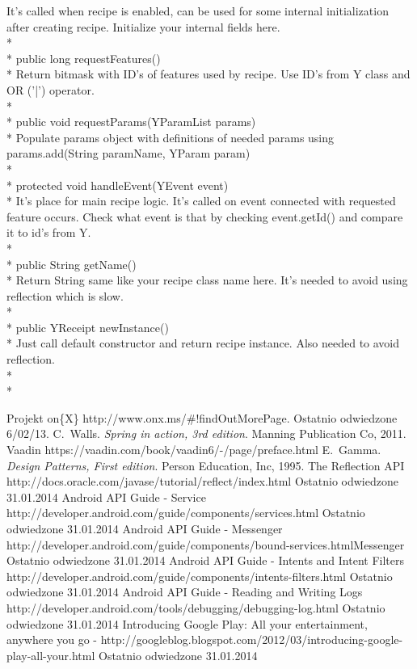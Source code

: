 \documentclass[11pt,a4paper,polish,thesis]{dcsbook}
\begin{document}
It's called when recipe is enabled, can be used for some internal initialization after creating recipe. Initialize your internal fields here.\\*\\*
public long requestFeatures()\\*
Return bitmask with ID's of features used by recipe. Use ID's from Y class and OR ('|') operator.\\*\\*
public void requestParams(YParamList params)\\*
Populate params object with definitions of needed params using params.add(String paramName, YParam param)\\*\\*
protected void handleEvent(YEvent event)\\*
It's place for main recipe logic. It's called on event connected with requested feature occurs. Check what event is that by checking event.getId() and compare it to id's from Y.\\*\\*
public String getName()\\*
Return String same like your recipe class name here. It's needed to avoid using reflection which is slow.\\*\\*
public YReceipt newInstance()\\*
Just call default constructor and return recipe instance. Also needed to avoid reflection.\\*\\*



\backmatter

\begin{thebibliography}{1}
Projekt on\{X\} http://www.onx.ms/\#!findOutMorePage. Ostatnio odwiedzone 6/02/13.
C.~Walls. \emph{Spring in action, 3rd edition}. Manning Publication Co, 2011.
Vaadin https://vaadin.com/book/vaadin6/-/page/preface.html 
E.~Gamma. \emph{Design Patterns, First edition}. Person Education, Inc, 1995.
The Reflection API  http://docs.oracle.com/javase/tutorial/reflect/index.html Ostatnio odwiedzone 31.01.2014
 Android API Guide - Service http://developer.android.com/guide/components/services.html Ostatnio odwiedzone 31.01.2014
 Android API Guide - Messenger http://developer.android.com/guide/components/bound-services.htmlMessenger  Ostatnio odwiedzone 31.01.2014 
 Android API Guide - Intents and Intent Filters http://developer.android.com/guide/components/intents-filters.html Ostatnio odwiedzone 31.01.2014 
 Android API Guide - Reading and Writing Logs http://developer.android.com/tools/debugging/debugging-log.html Ostatnio odwiedzone 31.01.2014
Introducing Google Play: All your entertainment, anywhere you go - http://googleblog.blogspot.com/2012/03/introducing-google-play-all-your.html Ostatnio odwiedzone 31.01.2014
\end{thebibliography}
\end{document}
